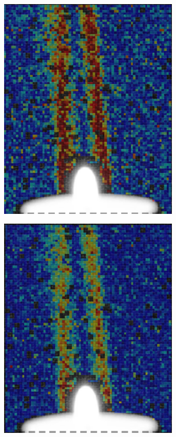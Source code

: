 \documentclass[letterpaper,12pt]{article}
\begin{document}
\begin{figure}[h]
\begin{subfigure}[b]{0.3\textwidth}
        \includegraphics[width=0.95\textwidth]{Candle_Select_Region_Colormap.PNG}
        \caption{}
        \label{fig:Candle_Select_Region_Colormap}
    \end{subfigure}
    \begin{subfigure}[b]{0.3\textwidth}
    	\centering
        \includegraphics[width=0.95\textwidth]{Candle_Edit_Region_Colormap.PNG}

\end{subfigure}
\end{figure}
\end{document}
